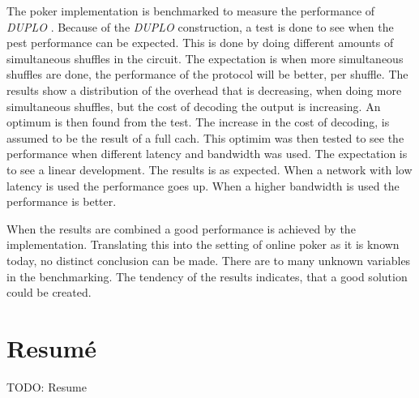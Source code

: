 \documentclass[twoside,11pt,openright]{report}
\newcommand{\todo}[1]{}
\renewcommand{\todo}[1]{{\color{red} TODO: {#1}} \\}
\newcommand{\DUPLO}{\textit{DUPLO} }
\begin{document}
The poker implementation is benchmarked to measure the performance of \DUPLO. Because of the \DUPLO construction, a test is done to see when the pest performance can be expected. This is done by doing different amounts of simultaneous shuffles in the circuit. The expectation is when more simultaneous shuffles are done, the performance of the protocol will be better, per shuffle. The results show a distribution of the overhead that is decreasing, when doing more simultaneous shuffles, but the cost of decoding the output is increasing. An optimum is then found from the test. The increase in the cost of decoding, is assumed to be the result of a full cach. This optimim was then tested to see the performance when different latency and bandwidth was used. The expectation is to see a linear development. The results is as expected. When a network with low latency is used the performance goes up. When a higher bandwidth is used the performance is better.

When the results are combined a good performance is achieved by the implementation. Translating this into the setting of online poker as it is known today, no distinct conclusion can be made. There are to many unknown variables in the benchmarking. The tendency of the results indicates, that a good solution could be created.


\chapter*{Resum\'e}
\todo{Resume}

\end{document}
